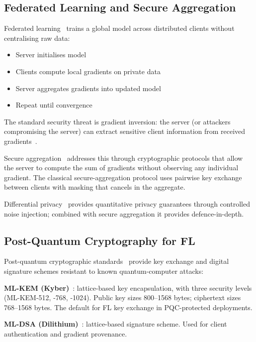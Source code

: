 \documentclass[sigconf,nonacm]{acmart}
\begin{document}
\subsection{Federated Learning and Secure Aggregation}

Federated learning~\cite{mcmahan2017fedavg} trains a global
model across distributed clients without centralising raw data:

\begin{itemize}
  \item Server initialises model
  \item Clients compute local gradients on private data
  \item Server aggregates gradients into updated model
  \item Repeat until convergence
\end{itemize}

The standard security threat is gradient inversion:
the server (or attackers compromising the server) can extract
sensitive client information from received
gradients~\cite{geiping2024invertingsurvey,zhu2024gradleakage}.

Secure aggregation~\cite{bonawitz2017secagg} addresses this
through cryptographic protocols that allow the server to compute
the sum of gradients without observing any individual gradient.
The classical secure-aggregation protocol uses pairwise key
exchange between clients with masking that cancels in the
aggregate.

Differential privacy~\cite{abadi2016deep} provides
quantitative privacy guarantees through controlled noise
injection; combined with secure aggregation it provides
defence-in-depth.

\subsection{Post-Quantum Cryptography for FL}

Post-quantum cryptographic standards~\cite{nist2024fips203,
nist2024fips204} provide key exchange and digital signature
schemes resistant to known quantum-computer attacks:

\textbf{ML-KEM (Kyber)}~\cite{nist2024fips203}: lattice-based
key encapsulation, with three security levels (ML-KEM-512,
-768, -1024). Public key sizes 800--1568 bytes; ciphertext sizes
768--1568 bytes. The default for FL key exchange in PQC-protected
deployments.

\textbf{ML-DSA (Dilithium)}~\cite{nist2024fips204}: lattice-based
signature scheme. Used for client authentication and gradient
provenance.
\end{document}
